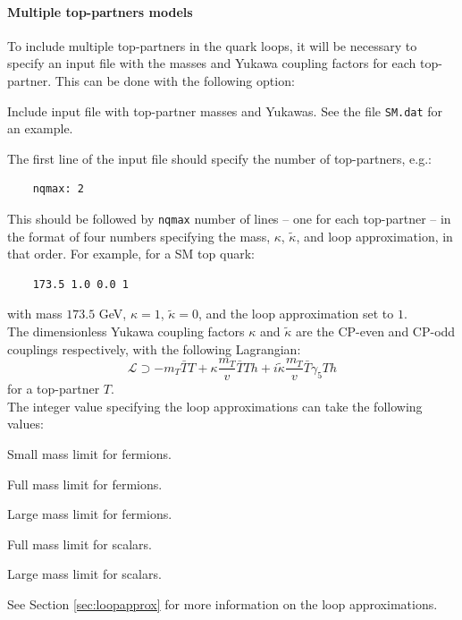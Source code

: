 \documentclass[12pt,a4wide]{article}
\begin{document}
\paragraph{Multiple top-partners models}
To include multiple top-partners in the quark loops, it will be necessary to specify an input file with the masses and Yukawa coupling factors for each top-partner. This can be done with the following option: 
\begin{description}[labelindent=\parindent, labelwidth =\widthof{\bfseries9999999999999999999999}, leftmargin = !] 
	\item[\texttt{-i, --in <file>}] Include input file with top-partner masses and Yukawas. See the file \texttt{SM.dat} for an example. 
\end{description} 
The first line of the input file should specify the number of top-partners, e.g.: 
\begin{lstlisting}
	nqmax: 2 
\end{lstlisting}
This should be followed by \texttt{nqmax} number of lines -- one for each top-partner -- in the format of four numbers specifying the mass, $\kappa$, $\tilde{\kappa}$, and loop approximation, in that order. For example, for a SM top quark: 
\begin{lstlisting}
	173.5 1.0 0.0 1 
\end{lstlisting}
with mass $173.5$ GeV, $\kappa = 1$, $\tilde{\kappa} = 0$, and the loop approximation set to $1$. \\ 

The dimensionless Yukawa coupling factors $\kappa$ and $\tilde{\kappa}$ are the CP-even and CP-odd couplings respectively, with the following Lagrangian: 
\begin{equation}
	\mathcal{L} \supset -m_T \bar{T}T + \kappa \frac{m_T}{v} \bar{T}T h + i \tilde{\kappa} \frac{m_T}{v} \bar{T} \gamma_5 T h 
\end{equation}
for a top-partner $T$. \\ 

The integer value specifying the loop approximations can take the following values: 
\begin{description}[labelindent=3\parindent, labelwidth =\widthof{\bfseries9999}, leftmargin = !] 
	\item[$0$] Small mass limit for fermions. 
	\item[$1$] Full mass limit for fermions. 
	\item[$2$] Large mass limit for fermions. 
	\item[$3$] Full mass limit for scalars. 
	\item[$4$] Large mass limit for scalars. 
\end{description}
See Section \ref{sec:loopapprox} for more information on the loop approximations. 
\end{document}
